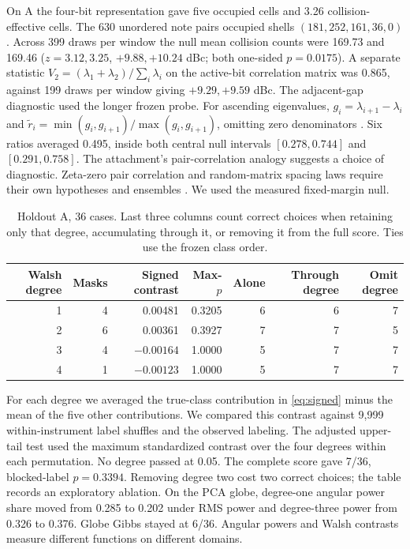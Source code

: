 \documentclass[11pt,a4paper]{article}
\begin{document}
On A the four-bit representation gave five occupied cells and 3.26 collision-effective cells. The 630 unordered note pairs occupied shells $(181,252,161,36,0)$. Across 399 draws per window the null mean collision counts were 169.73 and 169.46 ($z=3.12,3.25$, $+9.88,+10.24$ dBc; both one-sided $p=0.0175$). A separate statistic $V_2=(\lambda_1+\lambda_2)/\sum_i\lambda_i$ on the active-bit correlation matrix was 0.865, against 199 draws per window giving $+9.29,+9.59$ dBc. The adjacent-gap diagnostic used the longer frozen probe. For ascending eigenvalues, $g_i=\lambda_{i+1}-\lambda_i$ and $\tilde r_i=\min(g_i,g_{i+1})/\max(g_i,g_{i+1})$, omitting zero denominators \citep{atas}. Six ratios averaged 0.495, inside both central null intervals $[0.278,0.744]$ and $[0.291,0.758]$. The attachment's pair-correlation analogy suggests a choice of diagnostic. Zeta-zero pair correlation and random-matrix spacing laws require their own hypotheses and ensembles \citep{montgomery}. We used the measured fixed-margin null.

\begin{table}[ht]
\centering\small
\begin{tabular}{@{}rrrrrrr@{}}
\toprule
Walsh degree & Masks & Signed contrast & Max-$p$ & Alone & Through degree & Omit degree\\ \midrule
1 &4 & 0.00481 &0.3205 &6&6&7\\
2 &6 & 0.00361 &0.3927 &7&7&5\\
3 &4 &$-0.00164$&1.0000 &5&7&7\\
4 &1 &$-0.00123$&1.0000 &5&7&7\\ \bottomrule
\end{tabular}
\caption{Holdout A, 36 cases. Last three columns count correct choices when retaining only that degree, accumulating through it, or removing it from the full score. Ties use the frozen class order.}
\end{table}
For each degree we averaged the true-class contribution in \eqref{eq:signed} minus the mean of the five other contributions. We compared this contrast against 9,999 within-instrument label shuffles and the observed labeling. The adjusted upper-tail test used the maximum standardized contrast over the four degrees within each permutation. No degree passed at 0.05. The complete score gave 7/36, blocked-label $p=0.3394$. Removing degree two cost two correct choices; the table records an exploratory ablation. On the PCA globe, degree-one angular power share moved from 0.285 to 0.202 under RMS power and degree-three power from 0.326 to 0.376. Globe Gibbs stayed at 6/36. Angular powers and Walsh contrasts measure different functions on different domains.
\end{document}
